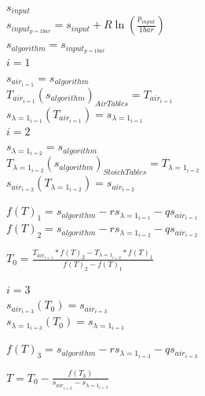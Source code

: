 \documentclass[titlepage]{article}
\begin{document}
    \begin{center}
        
        $s_{input}$ \\
        $s_{input_{p=1 bar}} = s_{input} + R \ln \left( \frac{p_{input}}{1 bar} \right)$ \\
        $s_{algorithm} = s_{input_{p=1 bar}}$ \\

        \vspace*{0.5cm}
        $i = 1$ \\
        $s_{air_{i=1}} = s_{algorithm}$ \\
        $T_{air_{i=1}}(s_{algorithm})_{Air Tables} = T_{air_{i=1}}$ \\
        $s_{\lambda=1_{i=1}}(T_{air_{i=1}}) = s_{\lambda =1_{i=1}}$ \\

        \vspace*{0.5cm}
        $i = 2$ \\
        $s_{\lambda =1_{i=2}} = s_{algorithm}$ \\
        $T_{\lambda =1_{i=2}}(s_{algorithm})_{Stoich Tables} = T_{\lambda =1_{i=2}}$ \\
        $s_{air_{i=2}}(T_{\lambda =1_{i=2}}) = s_{air_{i=2}}$ \\

        \vspace*{0.5cm}

        $f(T)_{1} = s_{algorithm} - r s_{\lambda=1_{i=1}} - q s_{air_{i=1}}$ \\
        $f(T)_{2} = s_{algorithm} - r s_{\lambda=1_{i=2}} - q s_{air_{i=2}}$ \\

        \vspace*{0.5cm}

        $T_{0} = \frac{T_{air_{i=1}} * f(T)_{2} - T_{\lambda=1_{i=2}} * f(T)_{1}}{f(T)_{2} - f(T)_{1}}$ \\

        \vspace*{0.5cm}

        $i= 3$ \\
        $s_{air_{i=3}}(T_{0}) = s_{air_{i=3}}$ \\
        $s_{\lambda=1_{i=3}}(T_{0}) = s_{\lambda=1_{i=3}}$ \\

        \vspace*{0.5cm}

        $f(T)_{3} = s_{algorithm} - r s_{\lambda=1_{i=3}} - q s_{air_{i=3}}$ \\

        \vspace*{0.5cm}

        $T = T_{0}  - \frac{f(T_{3})}{s_{air_{i=3}} - s_{\lambda=1_{i=3}}}$ \\ 
    \end{center}
\end{document}
